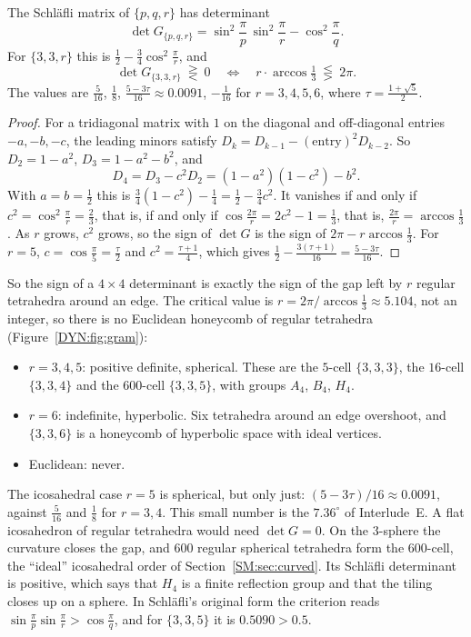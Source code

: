 \begin{proposition}\label{DYN:prop:gram335}
The Schl\"afli matrix of $\{p,q,r\}$ has determinant
\[
  \det G_{\{p,q,r\}}=\sin^2\frac\pi p\,\sin^2\frac\pi r-\cos^2\frac\pi q .
\]
For $\{3,3,r\}$ this is $\frac12-\frac34\cos^2\frac\pi r$, and
\[
  \det G_{\{3,3,r\}}\ \gtreqless\ 0\quad\iff\quad r\cdot\arccos\tfrac13\ \lesseqgtr\ 2\pi .
\]
The values are $\frac5{16}$, $\frac18$, $\frac{5-3\tau}{16}\approx0.0091$, $-\frac1{16}$ for
$r=3,4,5,6$, where $\tau=\frac{1+\sqrt5}2$.
\end{proposition}

\begin{proof}
For a tridiagonal matrix with $1$ on the diagonal and off-diagonal entries $-a,-b,-c$, the leading
minors satisfy $D_k=D_{k-1}-(\text{entry})^2D_{k-2}$. So $D_2=1-a^2$, $D_3=1-a^2-b^2$, and
\[
  D_4=D_3-c^2D_2=(1-a^2)(1-c^2)-b^2 .
\]
With $a=b=\frac12$ this is $\frac34(1-c^2)-\frac14=\frac12-\frac34c^2$. It vanishes if and only if
$c^2=\cos^2\frac\pi r=\frac23$, that is, if and only if $\cos\frac{2\pi}r=2c^2-1=\frac13$, that is,
$\frac{2\pi}r=\arccos\frac13$. As $r$ grows, $c^2$ grows, so the sign of $\det G$ is the sign of
$2\pi-r\arccos\frac13$. For $r=5$, $c=\cos\frac\pi5=\frac\tau2$ and $c^2=\frac{\tau+1}4$, which gives
$\frac12-\frac{3(\tau+1)}{16}=\frac{5-3\tau}{16}$.
\end{proof}

So the sign of a $4\times4$ determinant is exactly the sign of the gap left by $r$ regular tetrahedra
around an edge. The critical value is $r=2\pi/\arccos\frac13\approx5.104$, not an integer, so
there is no Euclidean honeycomb of regular tetrahedra (Figure~\ref{DYN:fig:gram}):
\begin{itemize}[nosep]
\item $r=3,4,5$: positive definite, spherical. These are the $5$-cell $\{3,3,3\}$, the $16$-cell
  $\{3,3,4\}$ and the $600$-cell $\{3,3,5\}$, with groups $A_4$, $B_4$, $H_4$.
\item $r=6$: indefinite, hyperbolic. Six tetrahedra around an edge overshoot, and $\{3,3,6\}$ is a
  honeycomb of hyperbolic space with ideal vertices.
\item Euclidean: never.
\end{itemize}
The icosahedral case $r=5$ is spherical, but only just: $(5-3\tau)/16\approx0.0091$, against
$\frac5{16}$ and $\frac18$ for $r=3,4$. This small number is the $7.36^\circ$ of Interlude~E. A flat
icosahedron of regular tetrahedra would need $\det G=0$. On the $3$-sphere the curvature closes the
gap, and $600$ regular spherical tetrahedra form the $600$-cell, the ``ideal'' icosahedral order of
Section~\ref{SM:sec:curved}. Its Schl\"afli determinant is positive, which says that $H_4$ is a finite
reflection group and that the tiling closes up on a sphere. In Schl\"afli's original form the criterion
reads $\sin\frac\pi p\sin\frac\pi r>\cos\frac\pi q$, and for $\{3,3,5\}$ it is
$0.5090>0.5$.

